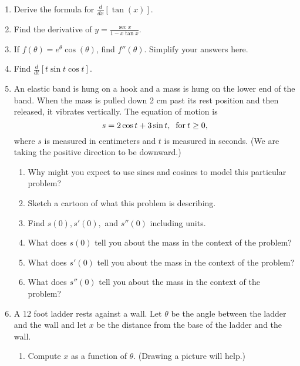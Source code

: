 \documentclass[11pt,fleqn]{article}
\begin{document}
\begin{enumerate}
\item Derive the formula for $\frac{d}{dx}\left[ \tan (x) \right].$
\vfill
\item Find the derivative of $\displaystyle{y=\frac{\sec x}{1-x\tan x}}.$
\vfill
\newpage
\item If $f(\theta) = e^{\theta} \cos(\theta)$, find $f '' (\theta).$ Simplify your answers here. 
\vfill
\item Find $\displaystyle{\frac{d}{dt}\left[t \sin t \cos t\right]}$. 
\vfill 
\newpage
\item An elastic band is hung on a hook and a mass is hung on the lower end of the band. When the mass is pulled down 2 cm past its rest position and then released, it vibrates vertically. The equation of motion is $$s=2 \cos t +3 \sin t, \text{\: for\:} t \geq 0,$$ where $s$ is measured in centimeters and $t$ is measured in seconds. (We are taking the positive direction to be downward.)
\begin{enumerate}
\item Why might you expect to use sines and cosines to model this particular problem?\\
\vspace{.4in}
\item Sketch a cartoon of what this problem is describing.\\
\vfill
\item Find $s(0), s'(0),$ and $s''(0)$ including units.
\vfill
\item What does $s(0)$ tell you about the mass in the context of the problem?\\
\vfill
\item What does $s'(0)$ tell you about the mass in the context of the problem?\\
\vfill
\item What does $s''(0)$ tell you about the mass in the context of the problem?\\
\vfill
\end{enumerate}
\newpage
\item A 12 foot ladder rests against a wall. Let $\theta$ be the angle between the ladder and the wall and let $x$ be the distance from the base of the ladder and the wall.
\begin{enumerate}
\item Compute $x$ as a function of $\theta$. (Drawing a picture will help.)
\vfill


\end{enumerate}
\end{enumerate}
\end{document}
